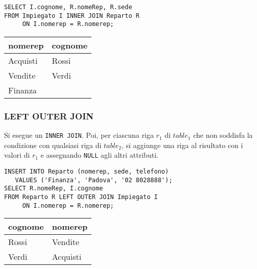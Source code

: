 \documentclass[a4paper, 10pt]{article}
\begin{document}
			\bigskip
			\noindent
			\begin{minipage}{0.6\textwidth}
					\begin{lstlisting}
SELECT I.cognome, R.nomeRep, R.sede
FROM Impiegato I INNER JOIN Reparto R
     ON I.nomerep = R.nomerep;
				\end{lstlisting}
				\end{minipage}\hfilneg\vrule\hfill
			\begin{minipage}{0.33\textwidth}
				\begin{tabular}{ll}
						\toprule
						\textbf{nomerep} & \textbf{cognome} \\
						\midrule
						Acquisti & Rossi \\
						Vendite & Verdi  \\
						Finanza &  \\
						\midrule
					\end{tabular}
				\end{minipage}
			
		\subsubsection*{LEFT OUTER JOIN}
			Si esegue un \lstinline|INNER JOIN|. Poi, per ciascuna riga $ r_1 $ di $ table_1 $ che non
			soddisfa la condizione con qualsiasi riga di $ table_2 $, si aggiunge una riga al
			risultato con i valori di $ r_1 $ e assegnando \lstinline|NULL| agli altri attributi.
			
			\bigskip
			\noindent
			\begin{minipage}{0.7\textwidth}
					\begin{lstlisting}
INSERT INTO Reparto (nomerep, sede, telefono)
   VALUES ('Finanza', 'Padova', '02 8028888');
SELECT R.nomeRep, I.cognome
FROM Reparto R LEFT OUTER JOIN Impiegato I 
     ON I.nomerep = R.nomerep;
				\end{lstlisting}
				\end{minipage}\hfilneg\vrule\hfill
			\begin{minipage}{.27\textwidth}
					\begin{tabular}{ll}
							\toprule
							\textbf{cognome} & \textbf{nomerep} \\
							\midrule
							Rossi & Vendite \\
							Verdi & Acquisti \\
		 					\midrule
						\end{tabular}
				\end{minipage}
		
\end{document}
